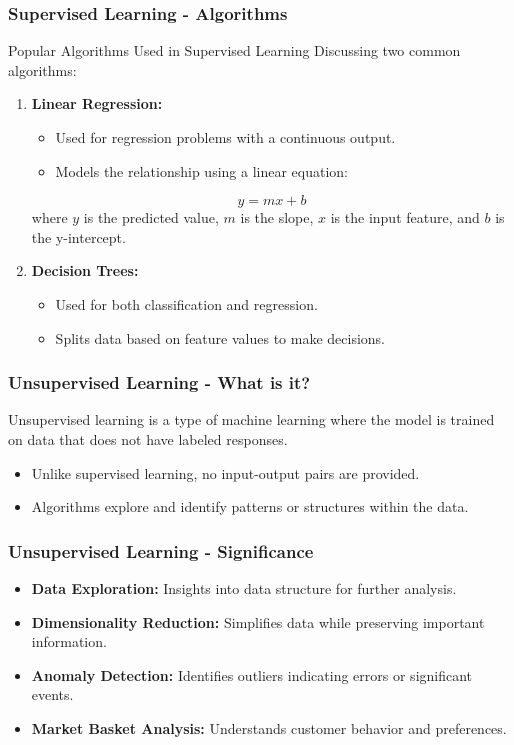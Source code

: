 \documentclass[aspectratio=169]{beamer}
\begin{document}
\begin{frame}[fragile]
    \frametitle{Supervised Learning - Algorithms}
    \begin{block}{Popular Algorithms Used in Supervised Learning}
        Discussing two common algorithms:
    \end{block}
    \begin{enumerate}
        \item \textbf{Linear Regression:}
            \begin{itemize}
                \item Used for regression problems with a continuous output.
                \item Models the relationship using a linear equation:
                \end{itemize}
                \begin{equation}
                    y = mx + b
                \end{equation}
                where \(y\) is the predicted value, \(m\) is the slope, \(x\) is the input feature, and \(b\) is the y-intercept.
                
        \item \textbf{Decision Trees:}
            \begin{itemize}
            \item Used for both classification and regression.
            \item Splits data based on feature values to make decisions.
            \end{itemize}
    \end{enumerate}
\end{frame}

\begin{frame}[fragile]
    \frametitle{Unsupervised Learning - What is it?}
    Unsupervised learning is a type of machine learning where the model is trained on data that does not have labeled responses. 
    \begin{itemize}
        \item Unlike supervised learning, no input-output pairs are provided.
        \item Algorithms explore and identify patterns or structures within the data.
    \end{itemize}
\end{frame}

\begin{frame}[fragile]
    \frametitle{Unsupervised Learning - Significance}
    \begin{itemize}
        \item \textbf{Data Exploration:} Insights into data structure for further analysis.
        \item \textbf{Dimensionality Reduction:} Simplifies data while preserving important information.
        \item \textbf{Anomaly Detection:} Identifies outliers indicating errors or significant events.
        \item \textbf{Market Basket Analysis:} Understands customer behavior and preferences.
    \end{itemize}
\end{frame}
\end{document}

